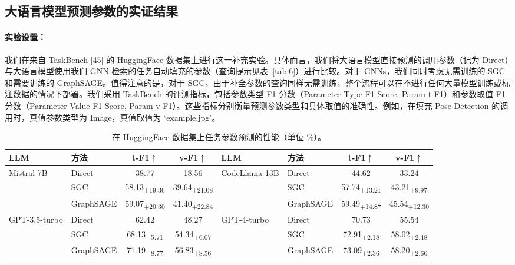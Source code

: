 \documentclass[11pt,UTF8,fontset=fandol]{ctexart}
\begin{document}
\subsection{大语言模型预测参数的实证结果}

\paragraph{实验设置：}我们在来自 TaskBench [45] 的 HuggingFace 数据集上进行这一补充实验。具体而言，我们将大语言模型直接预测的调用参数（记为 Direct）与大语言模型使用我们 GNN 检索的任务自动填充的参数（查询提示见表~\ref{tab:6}）进行比较。对于 GNNs，我们同时考虑无需训练的 SGC 和需要训练的 GraphSAGE。值得注意的是，对于 SGC，由于补全参数的查询同样无需训练，整个流程可以在不进行任何大量模型训练或标注数据的情况下部署。我们采用 TaskBench 的评测指标，包括参数类型 F1 分数（Parameter-Type F1-Score, Param t-F1）和参数取值 F1 分数（Parameter-Value F1-Score, Param v-F1）。这些指标分别衡量预测参数类型和具体取值的准确性。例如，在填充 Pose Detection 的调用时，真值参数类型为 Image，真值取值为 `example.jpg'。

\begin{table}[H]\centering
\caption{在 HuggingFace 数据集上任务参数预测的性能（单位 \%）。}
\label{tab:14}
\small
\setlength{\tabcolsep}{5pt}
\begin{tabular}{llcc@{\hskip 2em}llcc}
\toprule
LLM & 方法 & t-F1$\uparrow$ & v-F1$\uparrow$ & LLM & 方法 & t-F1$\uparrow$ & v-F1$\uparrow$\\
\midrule
\multirow{3}{*}{Mistral-7B}
& Direct & 38.77 & 18.56 & \multirow{3}{*}{CodeLlama-13B} & Direct & 44.62 & 33.24\\
& SGC & 58.13\textsubscript{+19.36} & 39.64\textsubscript{+21.08} & & SGC & 57.74\textsubscript{+13.21} & 43.21\textsubscript{+9.97}\\
& GraphSAGE & 59.07\textsubscript{+20.30} & 41.40\textsubscript{+22.84} & & GraphSAGE & 59.49\textsubscript{+14.87} & 45.54\textsubscript{+12.30}\\
\midrule
\multirow{3}{*}{GPT-3.5-turbo}
& Direct & 62.42 & 48.27 & \multirow{3}{*}{GPT-4-turbo} & Direct & 70.73 & 55.54\\
& SGC & 68.13\textsubscript{+5.71} & 54.34\textsubscript{+6.07} & & SGC & 72.91\textsubscript{+2.18} & 58.02\textsubscript{+2.48}\\
& GraphSAGE & 71.19\textsubscript{+8.77} & 56.83\textsubscript{+8.56} & & GraphSAGE & 73.09\textsubscript{+2.36} & 58.20\textsubscript{+2.66}\\
\bottomrule
\end{tabular}
\end{table}
\end{document}
